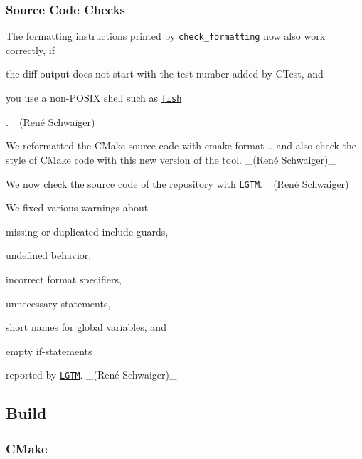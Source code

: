 \subsubsection*{Source Code Checks}


\begin{DoxyItemize}
\item The formatting instructions printed by \href{https://master.libelektra.org/tests/shell/check_formatting.sh}{\tt {\ttfamily check\+\_\+formatting}} now also work correctly, if
\begin{DoxyItemize}
\item the {\ttfamily diff} output does not start with the test number added by C\+Test, and
\item you use a non-\/\+P\+O\+S\+IX shell such as \href{https://fishshell.com}{\tt {\ttfamily fish}}
\end{DoxyItemize}

. \+\_\+(René Schwaiger)\+\_\+
\item We reformatted the C\+Make source code with cmake format {..} and also check the style of C\+Make code with this new version of the tool. \+\_\+(René Schwaiger)\+\_\+
\item We now check the source code of the repository with \href{https://lgtm.com}{\tt L\+G\+TM}. \+\_\+(René Schwaiger)\+\_\+
\item We fixed various warnings about
\begin{DoxyItemize}
\item missing or duplicated include guards,
\item undefined behavior,
\item incorrect format specifiers,
\item unnecessary statements,
\item short names for global variables, and
\item empty {\ttfamily if}-\/statements
\end{DoxyItemize}

reported by \href{https://lgtm.com}{\tt L\+G\+TM}. \+\_\+(René Schwaiger)\+\_\+
\end{DoxyItemize}

\subsection*{Build}

\subsubsection*{C\+Make}


